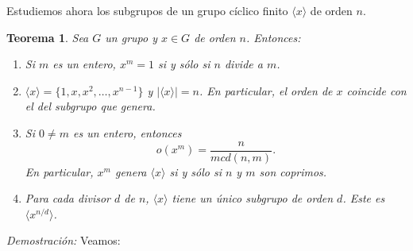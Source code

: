 \documentclass[12pt]{article}
\newtheorem{theorem}{Teorema}[section]
\begin{document}
Estudiemos ahora los subgrupos de un grupo cíclico finito $\langle x \rangle$ de orden $n$.

\begin{theorem}\label{eq:prelgrupcic}
Sea $G$ un grupo y $x \in G$ de orden $n$. Entonces:
\begin{enumerate}
\item Si $m$ es un entero, $x^m =1$ si y sólo si $n$ divide a $m$.
\item $\langle x \rangle = \lbrace 1, x, x^2, \ldots, x^{n-1} \rbrace$ y $|\langle x \rangle | = n$. En particular, el orden de $x$ coincide con el del subgrupo que genera.
\item Si $0\neq m$ es un entero, entonces $$o(x^m)= \dfrac{n}{mcd(n,m)}.$$ En particular, $x^m$ genera $\langle x \rangle$ si y sólo si $n$ y $m$ son coprimos.
\item Para cada divisor $d$ de $n$, $\langle x \rangle$ tiene un único subgrupo de orden $d$. Este es $\langle x^{n/d} \rangle$.
\end{enumerate}
\end{theorem}
\emph{Demostración: }Veamos:
\end{document}
